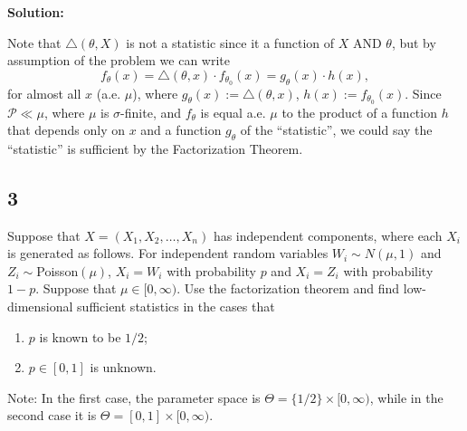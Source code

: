 \documentclass[12pt]{article}
\begin{document}
{\bf Solution:}

Note that $\triangle(\theta, X)$ is not a statistic since it a function of $X$ AND $\theta$, but by assumption of the problem we can write
\[ 
  f_{\theta}(x) = \triangle(\theta, x)\cdot f_{\theta_{0}}(x) = g_{\theta}(x) \cdot h(x),
\]
for almost all $x$ (a.e. $\mu$), where $g_{\theta}(x) := \triangle(\theta, x)$, $h(x) := f_{\theta_0}(x)$. Since $\mathcal{P} \ll \mu$, where $\mu$ is
$\sigma$-finite, and $f_{\theta}$ is equal a.e. $\mu$ to the product of a function $h$ that depends only on $x$ and a function $g_{\theta}$ of the
``statistic'', we could say the ``statistic'' is sufficient by the Factorization Theorem.


\newpage
\subsection*{3}
\begin{tcolorbox}
  Suppose that $X=(X_1,X_2,\ldots,X_n)$ has independent components, where each $X_i$ is generated as follows.  For independent random variables $W_i\sim N(\mu,1)$  and $Z_i \sim $Poisson$(\mu)$, $X_i=W_i$ with probability $p$ and $X_i=Z_i$ with probability $1-p$.  Suppose that $\mu\in[0,\infty)$.  Use the factorization theorem and find low-dimensional sufficient statistics in the cases that
  \begin{enumerate}
    \item $p$ is known to be $1/2$;
    \item $p\in[0,1]$ is unknown.
  \end{enumerate}
  Note: In the first case, the parameter space is $\Theta =\{1/2\}\times [0,\infty)$, while in the second case it is  $\Theta =[0,1]\times [0,\infty)$.
\end{tcolorbox}
\end{document}
